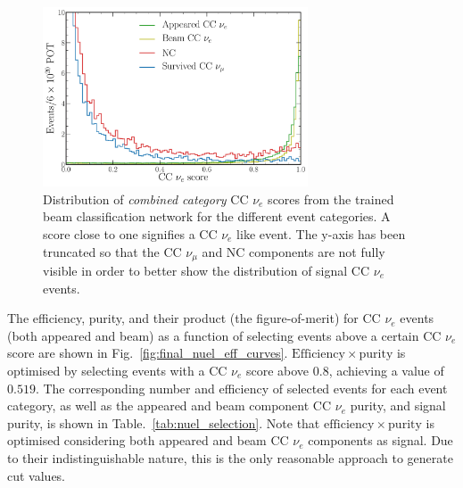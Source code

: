 \begin{figure} %
    \includegraphics[width=0.7\textwidth]{diagrams/6-cvn/chipsnet/final_beam_nuel_outputs.pdf}
    \caption[Distribution of CC $\nu_{e}$ scores from the trained beam classification network.]
    {Distribution of \emph{combined category} CC $\nu_{e}$ scores from the trained beam
        classification network for the different event categories. A score close to one signifies
        a CC $\nu_{e}$ like event. The y-axis has been truncated so that the CC $\nu_{\mu}$ and NC
        components are not fully visible in order to better show the distribution of signal CC
        $\nu_{e}$ events.}
    \label{fig:final_beam_nuel_outputs}
\end{figure}

The efficiency, purity, and their product (the figure-of-merit) for CC $\nu_{e}$ events (both
appeared and beam) as a function of selecting events above a certain CC $\nu_{e}$ score are shown
in Fig.~\ref{fig:final_nuel_eff_curves}. $\mathrm{Efficiency}\times\mathrm{purity}$ is optimised
by selecting events with a CC $\nu_{e}$ score above $0.8$, achieving a value of $0.519$. The
corresponding number and efficiency of selected events for each event category, as well as the
appeared and beam component CC $\nu_{e}$ purity, and signal purity, is shown in
Table.~\ref{tab:nuel_selection}. Note that $\mathrm{efficiency}\times\mathrm{purity}$ is optimised
considering both appeared and beam CC $\nu_{e}$ components as signal. Due to their
indistinguishable nature, this is the only reasonable approach to generate cut values.


